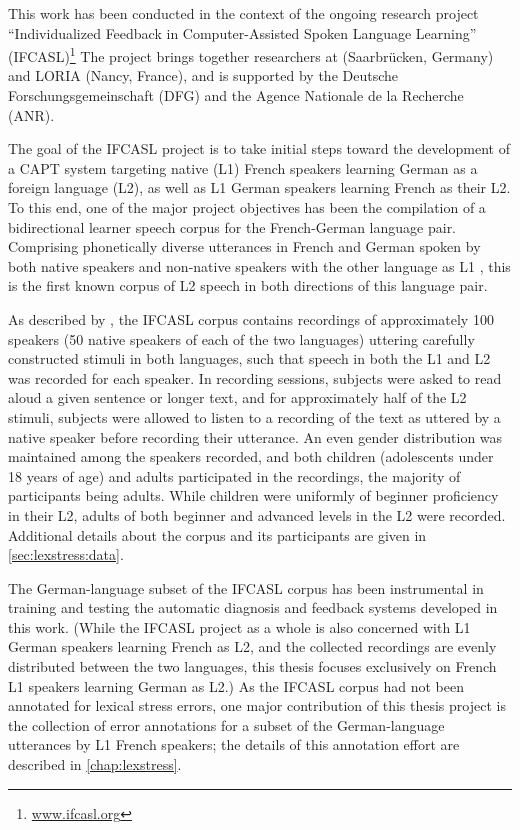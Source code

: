 This work has been conducted in the context of the ongoing 
research project ``Individualized Feedback in Computer-Assisted Spoken Language Learning'' (IFCASL)\footnote{\url{www.ifcasl.org}}
The project brings together researchers 
 at 
{\thesisUniversity} 
 (Saarbrücken, Germany) and LORIA (Nancy, France), and 
is supported by the Deutsche Forschungsgemeinschaft (DFG) and the Agence Nationale de la Recherche (ANR).

The goal of the IFCASL project is to take initial steps toward the development of a CAPT system targeting
native (L1) French speakers learning German as a foreign language (L2), 
as well as
L1 German speakers learning French as their L2. To this end, one of the major project objectives has been the compilation of a bidirectional learner speech corpus for the French-German language pair. Comprising phonetically diverse utterances in French and German spoken by both native speakers and non-native speakers with the other language as L1 \citep{Fauth2014,Trouvain2013}, this is the first known corpus of L2 speech in both directions of this language pair.

As described by \textcite{Trouvain2013,Fauth2014}, the IFCASL corpus contains recordings of approximately 100 speakers (50 native speakers of each of the two languages) uttering carefully constructed stimuli in both languages, such that speech in both the L1 and L2 was recorded for each speaker. In recording sessions, subjects were asked to read aloud a given sentence or longer text, and for approximately half of the L2 stimuli, subjects were allowed to listen to a recording of the text as uttered by a native speaker 
before recording their utterance. An even gender distribution was maintained among the speakers recorded, and both children (adolescents under 18 years of age) and adults participated in the recordings, the majority of participants being adults. While children were uniformly of beginner proficiency in their L2, adults of both beginner and advanced levels in the L2 were recorded. Additional details about the corpus and its participants are given in \cref{sec:lexstress:data}.


The German-language subset of the IFCASL corpus has been instrumental in training and testing the automatic diagnosis and feedback systems developed in this work.
 (While the IFCASL project as a whole is also concerned with L1 German speakers learning French as L2, and the 
 collected recordings are
 evenly distributed between the two languages, this thesis focuses exclusively on French L1 speakers learning German as L2.) 
As the IFCASL corpus had not been annotated for lexical stress errors, one major contribution of this thesis project is 
the collection of error annotations 
for a subset of the German-language utterances by L1 French speakers; the details of this annotation effort are described in \cref{chap:lexstress}. 

